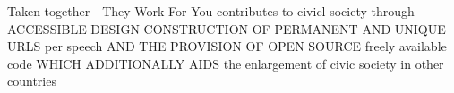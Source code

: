 Taken together - They Work For You contributes to civicl society
  through 
    ACCESSIBLE DESIGN
    CONSTRUCTION OF PERMANENT AND UNIQUE URLS per speech
    AND THE PROVISION OF OPEN SOURCE freely available code
      WHICH ADDITIONALLY AIDS the enlargement of civic society in other countries